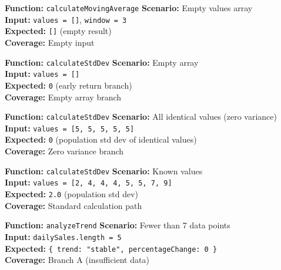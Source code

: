 \documentclass[12pt,a4paper]{report}
\newcommand{\ptwo}{\textbf{\color{p2orange}P2}}
\newcommand{\pthree}{\textbf{\color{p3blue}P3}}
\begin{document}
\begin{tcolorbox}[testbox,title={FORE-003 \hfill \pthree}]
\textbf{Function:} \texttt{calculateMovingAverage} \quad \textbf{Scenario:} Empty values array \\
\textbf{Input:} \texttt{values = []}, \texttt{window = 3} \\
\textbf{Expected:} \texttt{[]} (empty result) \\
\textbf{Coverage:} Empty input
\end{tcolorbox}

\begin{tcolorbox}[testbox,title={FORE-004 \hfill \pthree}]
\textbf{Function:} \texttt{calculateStdDev} \quad \textbf{Scenario:} Empty array \\
\textbf{Input:} \texttt{values = []} \\
\textbf{Expected:} \texttt{0} (early return branch) \\
\textbf{Coverage:} Empty array branch
\end{tcolorbox}

\begin{tcolorbox}[testbox,title={FORE-005 \hfill \pthree}]
\textbf{Function:} \texttt{calculateStdDev} \quad \textbf{Scenario:} All identical values (zero variance) \\
\textbf{Input:} \texttt{values = [5, 5, 5, 5, 5]} \\
\textbf{Expected:} \texttt{0} (population std dev of identical values) \\
\textbf{Coverage:} Zero variance branch
\end{tcolorbox}

\begin{tcolorbox}[testbox,title={FORE-006 \hfill \pthree}]
\textbf{Function:} \texttt{calculateStdDev} \quad \textbf{Scenario:} Known values \\
\textbf{Input:} \texttt{values = [2, 4, 4, 4, 5, 5, 7, 9]} \\
\textbf{Expected:} \texttt{2.0} (population std dev) \\
\textbf{Coverage:} Standard calculation path
\end{tcolorbox}

\begin{tcolorbox}[testbox,title={FORE-007 \hfill \ptwo}]
\textbf{Function:} \texttt{analyzeTrend} \quad \textbf{Scenario:} Fewer than 7 data points \\
\textbf{Input:} \texttt{dailySales.length = 5} \\
\textbf{Expected:} \texttt{\{ trend: "stable", percentageChange: 0 \}} \\
\textbf{Coverage:} Branch A (insufficient data)
\end{tcolorbox}
\end{document}
